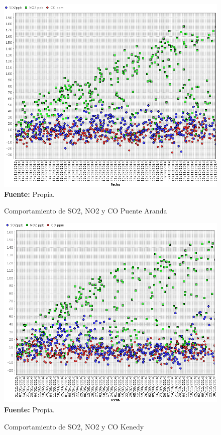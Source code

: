 \documentclass[a4paper,openright,12pt]{book}
\theoremstyle{definition}
\theoremstyle{remark}
\begin{document}
\begin{figure}[h]
\centering
\caption{Comportamiento de SO2, NO2 y CO Puente Aranda} 
\includegraphics[scale=0.43]{Componentes/Puente_Aranda_Componentes}
\label{fig:Tabla1}
\\ \textbf{Fuente: }Propia.
\end{figure}
\begin{figure}[h]
\centering
\caption{Comportamiento de SO2, NO2 y CO Kenedy} 
\includegraphics[scale=0.43]{Componentes/Kenedy_Componentes}
\label{fig:Tabla1}
\\ \textbf{Fuente: }Propia.
\end{figure}
\end{document}
